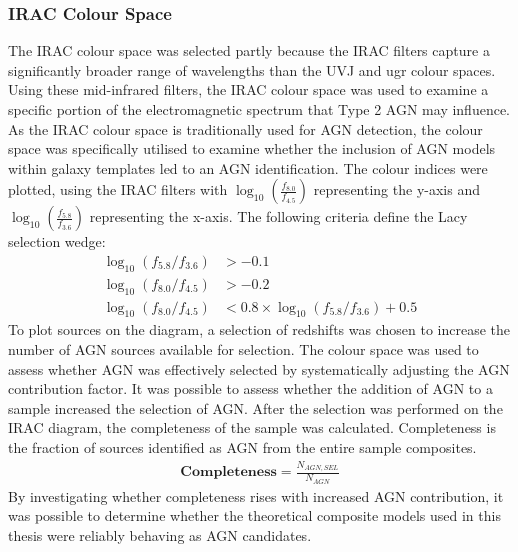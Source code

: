 \subsubsection{IRAC Colour Space}
The IRAC colour space was selected partly because the IRAC filters capture a significantly broader range of wavelengths than the UVJ and ugr colour spaces. Using these mid-infrared filters, the IRAC colour space was used to examine a specific portion of the electromagnetic spectrum that Type 2 AGN may influence. As the IRAC colour space is traditionally used for AGN detection, the colour space was specifically utilised to examine whether the inclusion of AGN models within galaxy templates led to an AGN identification. The colour indices were plotted, using the IRAC filters with $\log_{10} \left( \frac{f_{8.0}}{f_{4.5}} \right)$ representing the y-axis and $\log_{10} \left( \frac{f_{5.8}}{f_{3.6}} \right)$ representing the x-axis. The following criteria define the Lacy selection wedge:
\begin{align*}
    \log_{10}\left(f_{5.8}/f_{3.6}\right) &> -0.1\\
    \log_{10}\left(f_{8.0}/f_{4.5}\right) &> -0.2\\
    \log_{10}\left(f_{8.0}/f_{4.5}\right) &< 0.8 \times \log_{10}\left(f_{5.8}/f_{3.6}\right) + 0.5
\end{align*}
To plot sources on the diagram, a selection of redshifts was chosen to increase the number of AGN sources available for selection. The colour space was used to assess whether AGN was effectively selected by systematically adjusting the AGN contribution factor. It was possible to assess whether the addition of AGN to a sample increased the selection of AGN. After the selection was performed on the IRAC diagram, the completeness of the sample was calculated. Completeness is the fraction of sources identified as AGN from the entire sample composites.
\begin{align*}
    \textbf{Completeness} = \frac{N_{AGN, SEL}}{N_{AGN}}
\end{align*}
By investigating whether completeness rises with increased AGN contribution, it was possible to determine whether the theoretical composite models used in this thesis were reliably behaving as AGN candidates.
\newpage



